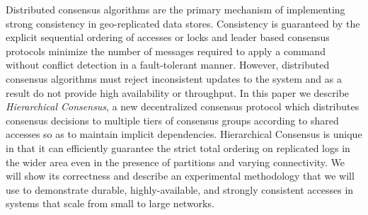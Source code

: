 Distributed consensus algorithms are the primary mechanism of implementing strong
consistency in geo-replicated data stores.
Consistency is guaranteed by the explicit sequential ordering of accesses or locks and
leader based consensus protocols minimize the number of messages required to apply a
command without conflict detection in a fault-tolerant manner.
However, distributed consensus algorithms must reject inconsistent updates to the system
and as a result do not provide high availability or throughput.
In this paper we describe \emph{Hierarchical Consensus}, a new decentralized consensus
protocol which distributes consensus decisions to multiple tiers of consensus groups
according to shared accesses so as to maintain implicit dependencies.
Hierarchical Consensus is unique in that it can efficiently guarantee the strict total
ordering on replicated logs in the wider area even in the presence of partitions and
varying connectivity. We will show its correctness and describe an experimental
methodology that we will use to demonstrate durable, highly-available, and strongly
consistent accesses in systems that scale from small to large networks.
